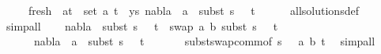 \begin{isabellebody}
\ \ \ \ \ fresh{\isacharcolon}{\kern0pt}\ {\isachardoublequoteopen}{\isasymforall}\ {\isacharparenleft}{\kern0pt}a{\isacharcomma}{\kern0pt}t{\isacharparenright}{\kern0pt}\ {\isasymin}\ set\ {\isacharparenleft}{\kern0pt}{\isacharparenleft}{\kern0pt}a{\isacharcomma}{\kern0pt}\ t{}{\isacharparenright}{\kern0pt}\ {\isacharhash}{\kern0pt}\ ys{\isacharparenright}{\kern0pt}{\isachardot}{\kern0pt}\ nabla{}\ {\isasymturnstile}\ a\ {\isasymsharp}\ subst\ {\isacharparenleft}{\kern0pt}s{}\ {\isasymbullet}\ {\isacharbrackleft}{\kern0pt}{\isacharbrackright}{\kern0pt}{\isacharparenright}{\kern0pt}\ t{\isachardoublequoteclose}\isanewline
\ \ \ \ \isamarkupfalse%
\ all{\isacharunderscore}{\kern0pt}solutions{\isacharunderscore}{\kern0pt}def\ \isamarkupfalse%
\ simp{\isacharunderscore}{\kern0pt}all\isanewline
\ \ \isamarkupfalse%
\ {\isachardoublequoteopen}nabla{}\ {\isasymturnstile}\ subst\ {\isacharparenleft}{\kern0pt}s{}\ {\isasymbullet}\ {\isacharbrackleft}{\kern0pt}{\isacharbrackright}{\kern0pt}{\isacharparenright}{\kern0pt}\ t{}\ {\isasymapprox}\ swap\ {\isacharbrackleft}{\kern0pt}{\isacharparenleft}{\kern0pt}a{\isacharcomma}{\kern0pt}\ b{\isacharparenright}{\kern0pt}{\isacharbrackright}{\kern0pt}\ {\isacharparenleft}{\kern0pt}subst\ {\isacharparenleft}{\kern0pt}s{}\ {\isasymbullet}\ {\isacharbrackleft}{\kern0pt}{\isacharbrackright}{\kern0pt}{\isacharparenright}{\kern0pt}\ t{}{\isacharparenright}{\kern0pt}{\isachardoublequoteclose}\isanewline
\ \ \ \ \ \ {\isachardoublequoteopen}nabla{}\ {\isasymturnstile}\ a\ {\isasymsharp}\ subst\ {\isacharparenleft}{\kern0pt}s{}\ {\isasymbullet}\ {\isacharbrackleft}{\kern0pt}{\isacharbrackright}{\kern0pt}{\isacharparenright}{\kern0pt}\ t{}{\isachardoublequoteclose}\ \isanewline
\ \ \ \ \isamarkupfalse%
\ subst{\isacharunderscore}{\kern0pt}swap{\isacharunderscore}{\kern0pt}comm{\isacharbrackleft}{\kern0pt}of\ {\isacartoucheopen}{\isacharparenleft}{\kern0pt}s{}\ {\isasymbullet}\ {\isacharbrackleft}{\kern0pt}{\isacharbrackright}{\kern0pt}{\isacharparenright}{\kern0pt}{\isacartoucheclose}\ {\isacartoucheopen}{\isacharbrackleft}{\kern0pt}{\isacharparenleft}{\kern0pt}a{\isacharcomma}{\kern0pt}\ b{\isacharparenright}{\kern0pt}{\isacharbrackright}{\kern0pt}{\isacartoucheclose}\ t{}{\isacharbrackright}{\kern0pt}\ \isamarkupfalse%
\ simp{\isacharunderscore}{\kern0pt}all\isanewline

\end{isabellebody}

